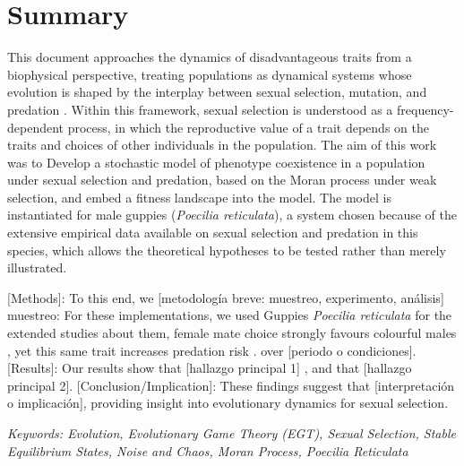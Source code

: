 \section{Summary}

This document approaches the dynamics of disadvantageous traits from a biophysical perspective, treating populations as dynamical systems whose evolution is shaped by the interplay between sexual selection, mutation, and predation \cite{nowakEvolutionaryDynamicsExploring2006}. Within this framework, sexual selection is understood as a frequency-dependent process, in which the reproductive value of a trait depends on the traits and choices of other individuals in the population. The aim of this work was to
Develop a stochastic model of phenotype coexistence in a population under sexual selection and predation, based on the Moran process under weak selection, and embed a fitness landscape into the model. The model is instantiated for male guppies (\textit{Poecilia reticulata}), a system chosen because of the extensive empirical data available on sexual selection and predation in this species, which allows the theoretical hypotheses to be tested rather than merely illustrated. 


[Methods]: To this end, we [metodología breve: muestreo, experimento, análisis] muestreo: For these implementations, we used Guppies \textit{Poecilia reticulata} for the extended studies about them, female mate choice strongly favours colourful males \cite{houdeMATECHOICEBASED1987}, yet this same trait increases predation risk \cite{magnhagen1991, godinPredatorPreferenceBrightly2003}. 
 over [periodo o condiciones]. [Results]: Our results show that [hallazgo principal 1] , and that [hallazgo principal 2]. [Conclusion/Implication]: These findings suggest that [interpretación o implicación], providing insight into evolutionary dynamics for sexual selection. 


\begin{center}
    \textit{Keywords: Evolution, Evolutionary Game Theory (EGT), Sexual Selection, Stable Equilibrium States, Noise and Chaos, Moran Process, Poecilia Reticulata}
\end{center}

